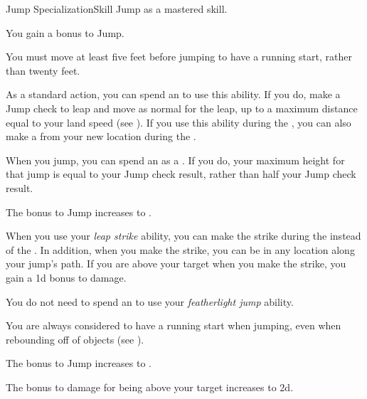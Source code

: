     \begin{feat}{Jump Specialization}{Skill}
        \featpre Jump as a mastered skill.
        \featben

         You gain a  bonus to Jump.

         You must move at least five feet before jumping to have a running start, rather than twenty feet.

         As a standard action, you can spend an  to use this ability.
        If you do, make a Jump check to leap and move as normal for the leap, up to a maximum distance equal to your land speed (see ).
        If you use this ability during the , you can also make a  from your new location during the .

         When you jump, you can spend an  as a .
        If you do, your maximum height for that jump is equal to your Jump check result, rather than half your Jump check result.

         The bonus to Jump increases to .

         When you use your \textit{leap strike} ability, you can make the strike during the  instead of the .
        In addition, when you make the strike, you can be in any location along your jump's path.
        If you are above your target when you make the strike, you gain a \plus1d bonus to damage.

         You do not need to spend an  to use your \textit{featherlight jump} ability.

         You are always considered to have a running start when jumping, even when rebounding off of objects (see ).

         The bonus to Jump increases to .

         The bonus to damage for being above your target increases to \plus2d.
    \end{feat}

